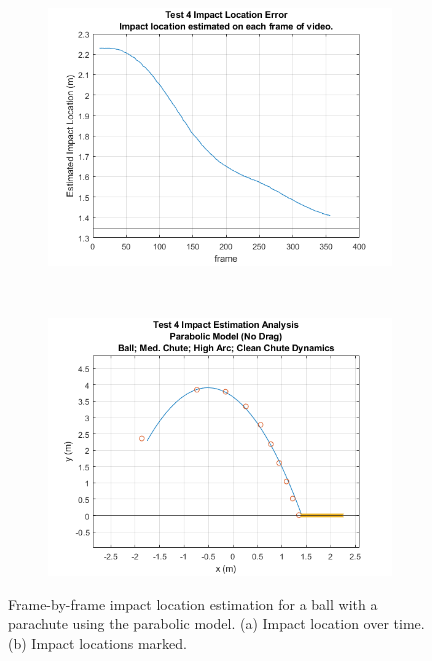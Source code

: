 \begin{figure}[t!]
    \centering
    \begin{subfigure}[t]{0.5\textwidth}
        \centering
        \includegraphics[width=\textwidth]{images/Analysis1_Test4_ImpLocPlot_NoDrag.png}
        \caption{}
    \end{subfigure}%
    ~ 
    \begin{subfigure}[t]{0.5\textwidth}
        \centering
        \includegraphics[width=\textwidth]{images/Analysis1_Test4_ImpLocHist_NoDrag.png}
        \caption{}
    \end{subfigure}
    \caption{\label{fig:Test4_NoDrag_FrameByFrame} Frame-by-frame impact location estimation for a ball with a parachute using the parabolic model. (a) Impact location over time. (b) Impact locations marked.}
\end{figure}

